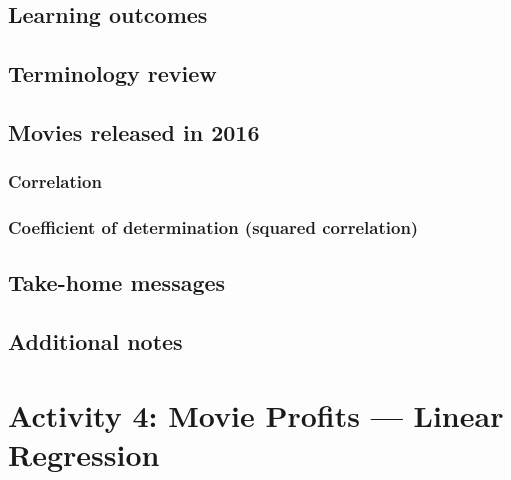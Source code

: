 \documentclass[
]{report}
\begin{document}
\hypertarget{learning-outcomes-6}{%
\subsection{Learning outcomes}\label{learning-outcomes-6}}

\hypertarget{terminology-review-6}{%
\subsection{Terminology review}\label{terminology-review-6}}

\hypertarget{movies-released-in-2016}{%
\subsection{Movies released in 2016}\label{movies-released-in-2016}}

\hypertarget{correlation}{%
\subsubsection*{Correlation}\label{correlation}}

\hypertarget{coefficient-of-determination-squared-correlation}{%
\subsubsection*{Coefficient of determination (squared correlation)}\label{coefficient-of-determination-squared-correlation}}

\hypertarget{take-home-messages-6}{%
\subsection{Take-home messages}\label{take-home-messages-6}}

\hypertarget{additional-notes-5}{%
\subsection{Additional notes}\label{additional-notes-5}}

\hypertarget{activity-4-movie-profits-linear-regression}{%
\section{Activity 4: Movie Profits --- Linear Regression}\label{activity-4-movie-profits-linear-regression}}
\end{document}
